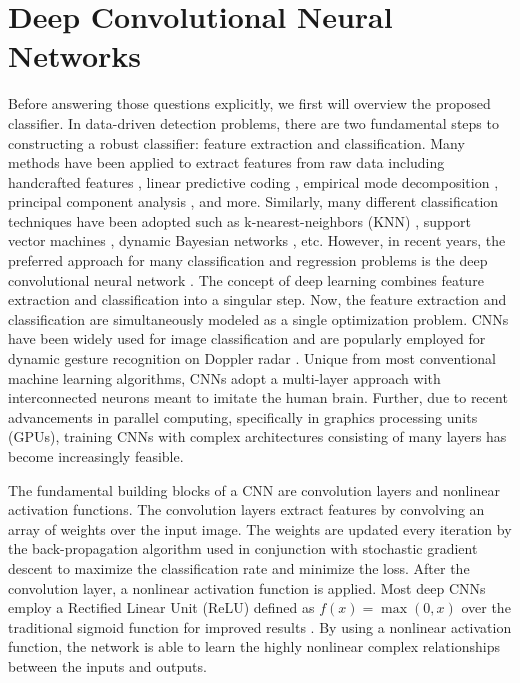 \documentclass{ieeeaccess}
\begin{document}
\section{Deep Convolutional Neural Networks}
\label{sec:dcnn}
Before answering those questions explicitly, we first will overview the proposed classifier. In data-driven detection problems, there are two fundamental steps to constructing a robust classifier: feature extraction and classification. Many methods have been applied to extract features from raw data including handcrafted features \cite{dynamic_gesture_recognition:svm,hand_crafted_features}, linear predictive coding \cite{linear_predictive_coding}, empirical mode decomposition \cite{empirical_mode_decomposition}, principal component analysis \cite{principal_component_analysis}, and more. Similarly, many different classification techniques have been adopted such as k-nearest-neighbors (KNN) \cite{KNN}, support vector machines \cite{dynamic_gesture_recognition:svm,static_gesture_recognition:time_domain}, dynamic Bayesian networks \cite{dynamic_bayesian_networks}, etc. 
However, in recent years, the preferred approach for many classification and regression problems is the deep convolutional neural network \cite{dynamic_gesture_recognition:micro_doppler}. The concept of deep learning combines feature extraction and classification into a singular step. Now, the feature extraction and classification are simultaneously modeled as a single optimization problem. CNNs have been widely used for image classification and are popularly employed for dynamic gesture recognition on Doppler radar \cite{dynamic_gesture_recognition:low_power,dynamic_gesture_recognition:application_of_Dopper_DCNN}. Unique from most conventional machine learning algorithms, CNNs adopt a multi-layer approach with interconnected neurons meant to imitate the human brain. Further, due to recent advancements in parallel computing, specifically in graphics processing units (GPUs), training CNNs with complex architectures consisting of many layers has become increasingly feasible. 

The fundamental building blocks of a CNN are convolution layers and nonlinear activation functions. The convolution layers extract features by convolving an array of weights over the input image. The weights are updated every iteration by the back-propagation algorithm used in conjunction with stochastic gradient descent to maximize the classification rate and minimize the loss. After the convolution layer, a nonlinear activation function is applied. Most deep CNNs employ a Rectified Linear Unit (ReLU) defined as $f(x) = \max(0,x)$ over the traditional sigmoid function for improved results \cite{ReLU}. By using a nonlinear activation function, the network is able to learn the highly nonlinear complex relationships between the inputs and outputs. 
\end{document}
